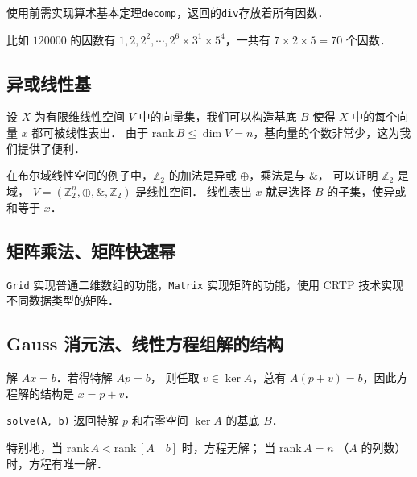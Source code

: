 使用前需实现算术基本定理{\tt decomp}，返回的{\tt div}存放着所有因数．

比如 $120000$ 的因数有 $1, 2, 2^2, \cdots, 2^6 \times 3^1 \times 5^4$，一共有 $7 \times 2 \times 5 = 70$ 个因数．



\subsection{异或线性基}

设 $X$ 为有限维线性空间 $V$ 中的向量集，我们可以构造基底 $B$ 使得 $X$ 中的每个向量 $x$ 都可被线性表出．
由于 $\text{rank}\, B \le \dim V = n$，基向量的个数非常少，这为我们提供了便利．

在布尔域线性空间的例子中，$\mathbb Z_2$ 的加法是异或 $\oplus$，乘法是与 $\&$，
可以证明 $\mathbb Z_2$ 是域，
$V = (\mathbb Z_2^n, \oplus, \&, \mathbb Z_2)$ 是线性空间．
线性表出 $x$ 就是选择 $B$ 的子集，使异或和等于 $x$．



\subsection{矩阵乘法、矩阵快速幂}

{\tt Grid} 实现普通二维数组的功能，{\tt Matrix} 实现矩阵的功能，使用 CRTP 技术实现不同数据类型的矩阵．



\newpage

\subsection{Gauss 消元法、线性方程组解的结构}

解 $Ax = b$．若得特解 $Ap = b$，
则任取 $v \in \ker A$，总有 $A(p + v) = b$，因此方程解的结构是 $x = p + v$．

{\tt solve(A, b)} 返回特解 $p$ 和右零空间 $\ker A$ 的基底 $B$．

特别地，当 $\text{rank}\, A < \text{rank}\, [ A \quad b ]$ 时，方程无解；
当 $\text{rank}\, A = n$ （$A$ 的列数）时，方程有唯一解．




